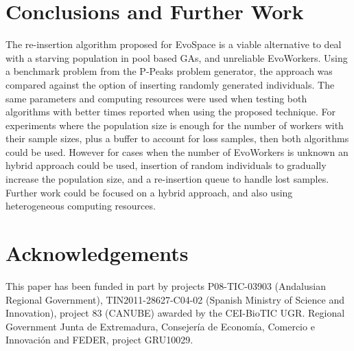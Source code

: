 \documentclass{llncs}
\begin{document}
 




\section{Conclusions and Further Work}
\label{sec:conclusions}

The re-insertion algorithm proposed for EvoSpace is a viable alternative
to deal with a starving population in pool based GAs, and unreliable EvoWorkers.
Using  a benchmark problem from the P-Peaks problem generator, 
the approach was compared against the option of inserting  
randomly generated individuals. The same parameters and computing resources
were used when testing both algorithms with better times reported when
using the proposed technique. For experiments where the population
size is enough for the number of workers with their sample sizes, plus a 
buffer to account for loss samples, then both algorithms could be used.
However for cases when the number of EvoWorkers is unknown an hybrid approach
could be used, insertion of random individuals to gradually increase the population
size, and a re-insertion queue to handle lost samples. Further work could be
focused on a hybrid approach, and also using heterogeneous computing resources. 

\section{Acknowledgements}

This paper has been funded in part by projects P08-TIC-03903 (Andalusian Regional Government), TIN2011-28627-C04-02 (Spanish Ministry of Science and Innovation), project 83 (CANUBE) awarded by the CEI-BioTIC UGR. Regional Government Junta de Extremadura, Consejería de Econom\'ia, Comercio e Innovaci\'on and FEDER, project GRU10029.

%

\begin{footnotesize}

\end{footnotesize}
\end{document}

